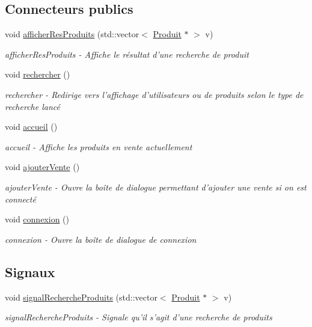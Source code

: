\subsection*{Connecteurs publics}
\begin{DoxyCompactItemize}
\item 
void \hyperlink{class_ma_fenetre_a115348adbe409a24a0d381e1fcc62fe7}{afficher\-Res\-Produits} (std\-::vector$<$ \hyperlink{class_produit}{Produit} $\ast$ $>$ v)
\begin{DoxyCompactList}\small\item\em afficher\-Res\-Produits -\/ Affiche le résultat d'une recherche de produit \end{DoxyCompactList}\item 
void \hyperlink{class_ma_fenetre_a8107c2666807db431962fdcd4e942c69}{rechercher} ()
\begin{DoxyCompactList}\small\item\em rechercher -\/ Redirige vers l'affichage d'utilisateurs ou de produits selon le type de recherche lancé \end{DoxyCompactList}\item 
void \hyperlink{class_ma_fenetre_abc0a097122f161ced271718b254206cd}{accueil} ()
\begin{DoxyCompactList}\small\item\em accueil -\/ Affiche les produits en vente actuellement \end{DoxyCompactList}\item 
void \hyperlink{class_ma_fenetre_abd8cb1d6b536873f3d369457073270c4}{ajouter\-Vente} ()
\begin{DoxyCompactList}\small\item\em ajouter\-Vente -\/ Ouvre la boîte de dialogue permettant d'ajouter une vente si on est connecté \end{DoxyCompactList}\item 
void \hyperlink{class_ma_fenetre_a65270bfc0eeecb1003c6abc9a1199f32}{connexion} ()
\begin{DoxyCompactList}\small\item\em connexion -\/ Ouvre la boîte de dialogue de connexion \end{DoxyCompactList}\end{DoxyCompactItemize}
\subsection*{Signaux}
\begin{DoxyCompactItemize}
\item 
void \hyperlink{class_ma_fenetre_a75cd895beb38fe68a4319eb6c37ac8ee}{signal\-Recherche\-Produits} (std\-::vector$<$ \hyperlink{class_produit}{Produit} $\ast$ $>$ v)
\begin{DoxyCompactList}\small\item\em signal\-Recherche\-Produits -\/ Signale qu'il s'agit d'une recherche de produits \end{DoxyCompactList}\end{DoxyCompactItemize}
